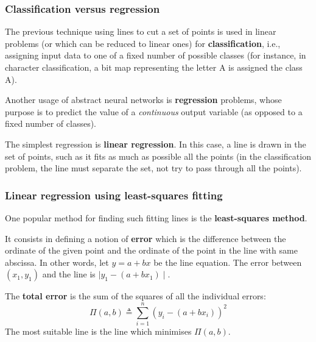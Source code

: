 \documentclass[compress,dvipdfmx]{beamer}
\begin{document}
%
\begin{frame}
\frametitle{Classification versus regression}

The previous technique using lines to cut a set of points is used in
linear problems (or which can be reduced to linear ones) for
\textbf{classification}, i.e., assigning input data to one of a fixed
number of possible classes (for instance, in character classification,
a bit map representing the letter A is assigned the class A).

\bigskip

Another usage of abstract neural networks is \textbf{regression}
problems, whose purpose is to predict the value of a \emph{continuous}
output variable (as opposed to a fixed number of classes).

\bigskip

The simplest regression is \textbf{linear regression}. In this case, a
line is drawn in the set of points, such as it fits as much as
possible all the points (in the classification problem, the line must
separate the set, not try to pass through all the points).

\end{frame}

%
\begin{frame}
\frametitle{Linear regression using
  least-squares fitting}

One popular method for finding such fitting lines is the
\textbf{least-squares method}.

\bigskip

It consists in defining a notion of \textbf{error} which is the
difference between the ordinate of the given point and the ordinate of
the point in the line with same abscissa. In other words, let \(y = a
+ b x\) be the line equation. The error between \((x_1,y_1)\) and the
line is \(\mid{y_1} - (a + b x_1)\mid\).

\bigskip

The \textbf{total error} is the sum of the squares of all the
individual errors:
\[
  \Pi(a,b) \triangleq \sum_{i=1}^{n}{(y_i - (a + b x_i))^2}
\]
The most suitable line is the line which minimises \(\Pi(a,b)\).

\end{frame}
\end{document}
